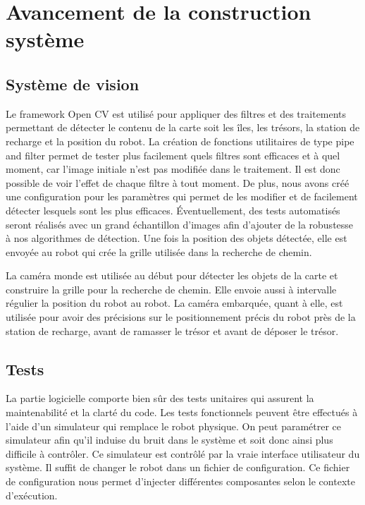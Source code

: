 \chapter{Avancement de la construction système}

\section{Système de vision}

Le framework Open CV est utilisé pour appliquer des filtres et des traitements permettant de détecter le contenu de la carte soit
les îles, les trésors, la station de recharge et la position du robot. La création de fonctions utilitaires de type pipe and filter
permet de tester plus facilement quels filtres sont efficaces et à quel moment, car l'image initiale n'est pas modifiée dans le
traitement. Il est donc possible de voir l'effet de chaque filtre à tout moment. De plus, nous avons créé une configuration
pour les paramètres qui permet de les modifier et de facilement détecter lesquels sont les plus efficaces. Éventuellement, des
tests automatisés seront réalisés avec un grand échantillon d'images afin d'ajouter de la robustesse à nos algorithmes de détection.
Une fois la position des objets détectée, elle est envoyée au robot qui crée la grille utilisée dans la recherche de chemin.


La caméra monde est utilisée au début pour détecter les objets de la carte et construire la grille pour la recherche de chemin. Elle envoie aussi à intervalle régulier la position du robot au robot. La caméra embarquée, quant à elle, est utilisée pour avoir des précisions sur le positionnement précis du robot près de la station de recharge, avant de ramasser le trésor et avant de déposer le trésor.

\section{Tests}
La partie logicielle comporte bien sûr des tests unitaires qui assurent la maintenabilité et la clarté du code.
Les tests fonctionnels peuvent être effectués à l'aide d'un simulateur qui remplace le robot physique.
On peut paramétrer ce simulateur afin qu'il induise du bruit dans le système et soit donc ainsi plus difficile à contrôler.
Ce simulateur est contrôlé par la vraie interface utilisateur du système.
Il suffit de changer le robot dans un fichier de configuration.
Ce fichier de configuration nous permet d'injecter différentes composantes selon le contexte d'exécution.

